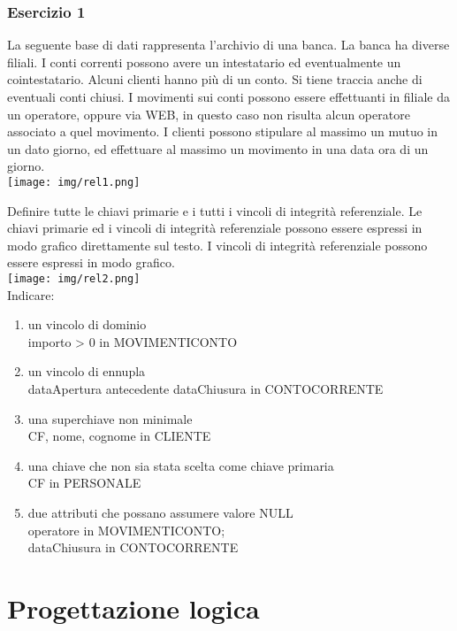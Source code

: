 \documentclass[a4paper]{article}
\begin{document}
\subsubsection{Esercizio 1}
La seguente base di dati rappresenta l’archivio di una banca. La banca ha diverse filiali. I conti correnti possono avere un intestatario ed eventualmente un cointestatario. Alcuni clienti hanno più di un conto. Si tiene traccia anche di eventuali conti chiusi. I movimenti sui conti possono essere effettuanti in filiale da un operatore, oppure via WEB, in questo caso non risulta alcun operatore associato a quel movimento. I clienti possono stipulare al massimo un mutuo in un dato giorno, ed effettuare al massimo un movimento in una data ora di un giorno.\medskip\medskip\\
\texttt{[image: img/rel1.png]}\par Definire tutte le chiavi primarie e i tutti i vincoli di integrità referenziale. Le chiavi primarie ed i vincoli di integrità referenziale possono essere espressi in modo grafico direttamente sul testo. I vincoli di integrità referenziale possono essere espressi in  modo grafico.\medskip\\
\texttt{[image: img/rel2.png]}\medskip\medskip\\
Indicare:
\begin{enumerate}
  \item un vincolo di dominio \\importo > 0 in MOVIMENTICONTO
  \item un vincolo di ennupla \\dataApertura antecedente dataChiusura in CONTOCORRENTE
  \item una superchiave non minimale \\CF, nome, cognome in CLIENTE
  \item una chiave che non sia stata scelta come chiave primaria \\CF in PERSONALE
  \item due attributi che possano assumere valore NULL \\operatore in MOVIMENTICONTO;\\dataChiusura in CONTOCORRENTE
\end{enumerate}\par 
\section{Progettazione logica}
\end{document}
